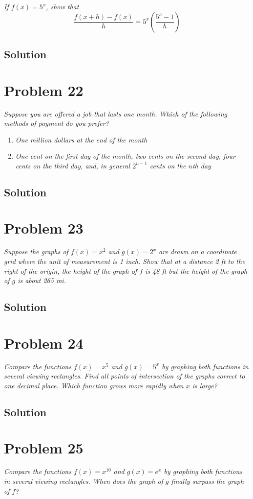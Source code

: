 \documentclass[11pt]{article}
\newcommand{\soln}{\subsection*}
\newcommand{\qn}{\textit}
\begin{document}
\qn{If $f(x)=5^x$, show that $$\frac{f(x+h)-f(x)}{h}=5^x(\frac{5^h-1}{h})$$}

\soln{Solution}

\section*{Problem 22}

\qn{Suppose you are offered a job that lasts one month. Which of the following methods of payment do you prefer?}
\begin{enumerate}
	\item \qn{One million dollars at the end of the month}
	
	\item \qn{One cent on the first day of the month, two cents on the second day, four cents on the third day, and, in general $2^{n-1}$ cents on the $n$th day}
\end{enumerate}

\soln{Solution}

\section*{Problem 23}

\qn{Suppose the graphs of $f(x)=x^2$ and $g(x)=2^x$ are drawn on a coordinate grid where the unit of measurement is 1 inch. Show that at a distance 2 ft to the right of the origin, the height of the graph of $f$ is 48 ft but the height of the graph of $g$ is about 265 mi.}

\soln{Solution}

\section*{Problem 24}

\qn{Compare the functions $f(x)=x^5$ and $g(x)=5^x$ by graphing both functions in several viewing rectangles. Find all points of intersection of the graphs correct to one decimal place. Which function grows more rapidly when $x$ is large?}

\soln{Solution}

\section*{Problem 25}

\qn{Compare the functions $f(x)=x^{10}$ and $g(x)=e^x$ by graphing both functions in several viewing rectangles. When does the graph of $g$ finally surpass the graph of $f$?}
\end{document}
